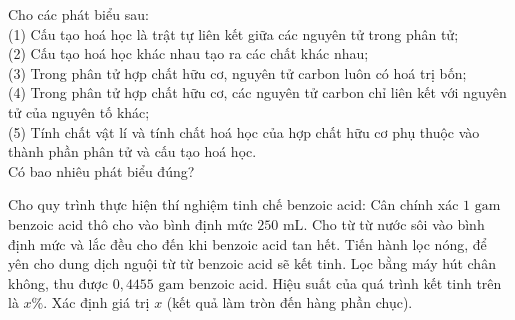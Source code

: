 \documentclass[12pt,a4paper]{article}
\begin{document}
\begin{ex}
Cho các phát biểu sau:\\
(1) Cấu tạo hoá học là trật tự liên kết giữa các nguyên tử trong phân tử;\\
(2) Cấu tạo hoá học khác nhau tạo ra các chất khác nhau;\\
(3) Trong phân tử hợp chất hữu cơ, nguyên tử carbon luôn có hoá trị bốn;\\
(4) Trong phân tử hợp chất hữu cơ, các nguyên tử carbon chỉ liên kết với nguyên tử của nguyên tố khác;\\
(5) Tính chất vật lí và tính chất hoá học của hợp chất hữu cơ phụ thuộc vào thành phần phân tử và cấu tạo hoá học.\\
Có bao nhiêu phát biểu đúng?

\end{ex}

\begin{ex}
Cho quy trình thực hiện thí nghiệm tinh chế benzoic acid:
Cân chính xác $1\text{ gam}$ benzoic acid thô cho vào bình định mức $250\text{ mL}$. Cho từ từ nước sôi vào bình định mức và lắc đều cho đến khi benzoic acid tan hết. Tiến hành lọc nóng, để yên cho dung dịch nguội từ từ benzoic acid sẽ kết tinh. Lọc bằng máy hút chân không, thu được $0{,}4455\text{ gam}$ benzoic acid. Hiệu suất của quá trình kết tinh trên là $x\%$. Xác định giá trị $x$ (kết quả làm tròn đến hàng phần chục).

\end{ex}
\end{document}
